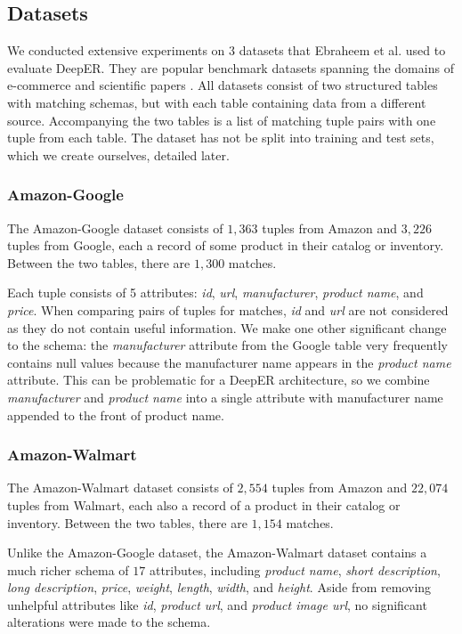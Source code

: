 \documentclass{proc}
\begin{document}
\subsection{Datasets}

We conducted extensive experiments on 3 datasets that Ebraheem et al. used to evaluate DeepER. They are popular benchmark datasets spanning the domains of e-commerce and scientific papers \cite{benchmark-datasets}. All datasets consist of two structured tables with matching schemas, but with each table containing data from a different source. Accompanying the two tables is a list of matching tuple pairs with one tuple from each table. The dataset has not be split into training and test sets, which we create ourselves, detailed later.

\subsubsection{Amazon-Google}

The Amazon-Google dataset consists of $1,363$ tuples from Amazon and $3,226$ tuples from Google, each a record of some product in their catalog or inventory. Between the two tables, there are $1,300$ matches.

Each tuple consists of 5 attributes: \textit{id}, \textit{url}, \textit{manufacturer}, \textit{product name}, and \textit{price}. When comparing pairs of tuples for matches, \textit{id} and \textit{url} are not considered as they do not contain useful information. We make one other significant change to the schema: the \textit{manufacturer} attribute from the Google table very frequently contains null values because the manufacturer name appears in the \textit{product name} attribute. This can be problematic for a DeepER architecture, so we combine \textit{manufacturer} and \textit{product name} into a single attribute with manufacturer name appended to the front of product name.

\subsubsection{Amazon-Walmart}

The Amazon-Walmart dataset consists of $2,554$ tuples from Amazon and $22,074$ tuples from Walmart, each also a record of a product in their catalog or inventory. Between the two tables, there are $1,154$ matches.

Unlike the Amazon-Google dataset, the Amazon-Walmart dataset contains a much richer schema of $17$ attributes, including \textit{product name}, \textit{short description}, \textit{long description}, \textit{price}, \textit{weight}, \textit{length}, \textit{width}, and \textit{height}. Aside from removing unhelpful attributes like \textit{id}, \textit{product url}, and \textit{product image url}, no significant alterations were made to the schema.
\end{document}
